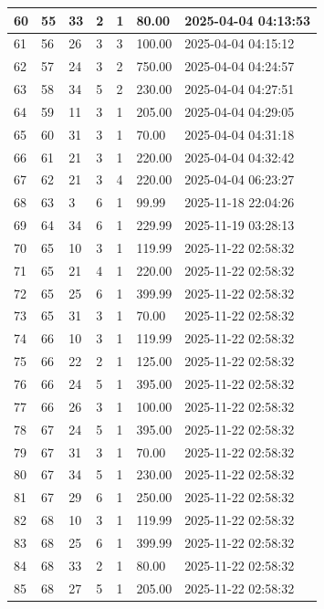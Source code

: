 \begin{longtable}{|l|l|l|l|l|l|l|}
60 & 55 & 33 & 2 & 1 & 80.00 & 2025-04-04 04:13:53 \\ \hline 
61 & 56 & 26 & 3 & 3 & 100.00 & 2025-04-04 04:15:12 \\ \hline 
62 & 57 & 24 & 3 & 2 & 750.00 & 2025-04-04 04:24:57 \\ \hline 
63 & 58 & 34 & 5 & 2 & 230.00 & 2025-04-04 04:27:51 \\ \hline 
64 & 59 & 11 & 3 & 1 & 205.00 & 2025-04-04 04:29:05 \\ \hline 
65 & 60 & 31 & 3 & 1 & 70.00 & 2025-04-04 04:31:18 \\ \hline 
66 & 61 & 21 & 3 & 1 & 220.00 & 2025-04-04 04:32:42 \\ \hline 
67 & 62 & 21 & 3 & 4 & 220.00 & 2025-04-04 06:23:27 \\ \hline 
68 & 63 & 3 & 6 & 1 & 99.99 & 2025-11-18 22:04:26 \\ \hline 
69 & 64 & 34 & 6 & 1 & 229.99 & 2025-11-19 03:28:13 \\ \hline 
70 & 65 & 10 & 3 & 1 & 119.99 & 2025-11-22 02:58:32 \\ \hline 
71 & 65 & 21 & 4 & 1 & 220.00 & 2025-11-22 02:58:32 \\ \hline 
72 & 65 & 25 & 6 & 1 & 399.99 & 2025-11-22 02:58:32 \\ \hline 
73 & 65 & 31 & 3 & 1 & 70.00 & 2025-11-22 02:58:32 \\ \hline 
74 & 66 & 10 & 3 & 1 & 119.99 & 2025-11-22 02:58:32 \\ \hline 
75 & 66 & 22 & 2 & 1 & 125.00 & 2025-11-22 02:58:32 \\ \hline 
76 & 66 & 24 & 5 & 1 & 395.00 & 2025-11-22 02:58:32 \\ \hline 
77 & 66 & 26 & 3 & 1 & 100.00 & 2025-11-22 02:58:32 \\ \hline 
78 & 67 & 24 & 5 & 1 & 395.00 & 2025-11-22 02:58:32 \\ \hline 
79 & 67 & 31 & 3 & 1 & 70.00 & 2025-11-22 02:58:32 \\ \hline 
80 & 67 & 34 & 5 & 1 & 230.00 & 2025-11-22 02:58:32 \\ \hline 
81 & 67 & 29 & 6 & 1 & 250.00 & 2025-11-22 02:58:32 \\ \hline 
82 & 68 & 10 & 3 & 1 & 119.99 & 2025-11-22 02:58:32 \\ \hline 
83 & 68 & 25 & 6 & 1 & 399.99 & 2025-11-22 02:58:32 \\ \hline 
84 & 68 & 33 & 2 & 1 & 80.00 & 2025-11-22 02:58:32 \\ \hline 
85 & 68 & 27 & 5 & 1 & 205.00 & 2025-11-22 02:58:32 \\ \hline 

\end{longtable}
